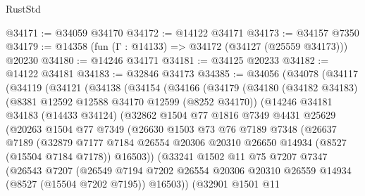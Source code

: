\begin{lexlean}{RustStd}
\begin{coremodule}
@34171 := @34059 @34170
@34172 := @14122 @34171
@34173 := @34157 @7350
@34179 := @14358 (fun (Γ : @14133) => @34172 (@34127 (@25559 @34173))) @20230
@34180 := @14246 @34171
@34181 := @34125 @20233
@34182 := @14122 @34181
@34183 := @32846 @34173
@34385 := @34056
    (@34078
      (@34117
        (@34119
          (@34121
            (@34138
              (@34154
                (@34166
                  (@34179
                    (@34180
                      (@34182 @34183)
                      (@8381 @12592 @12588 @34170 @12599 (@8252 @34170))
                      (@14246
                        @34181
                        @34183
                        (@14433 @34124)
                        (@32862
                          @1504
                          @77
                          @1816
                          @7349
                          @4431
                          @25629
                          (@20263
                            @1504
                            @77
                            @7349
                            (@26630
                              @1503
                              @73
                              @76
                              @7189
                              @7348
                              (@26637
                                @7189
                                (@32879
                                  @7177
                                  @7184
                                  @26554
                                  @20306
                                  @20310
                                  @26650
                                  @14934
                                  (@8527 (@15504 @7184 @7178))
                                  @16503))
                              (@33241
                                @1502
                                @11
                                @75
                                @7207
                                @7347
                                (@26543
                                  @7207
                                  (@26549
                                    @7194
                                    @7202
                                    @26554
                                    @20306
                                    @20310
                                    @26559
                                    @14934
                                    (@8527 (@15504 @7202 @7195))
                                    @16503))
                                (@32901
                                  @1501
                                  @11

\end{coremodule}
\end{lexlean}
